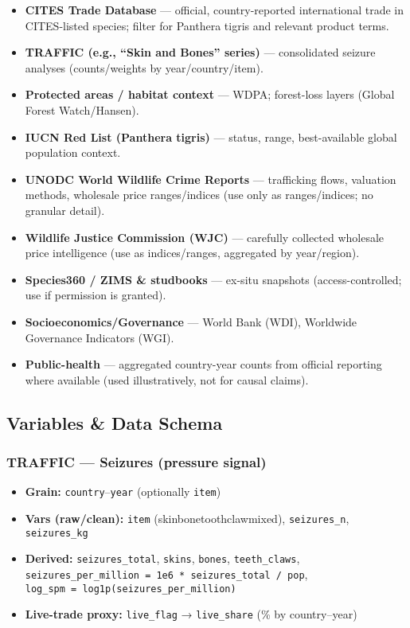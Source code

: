 \documentclass[
]{article}
\providecommand{\tightlist}{%
  \setlength{\itemsep}{0pt}\setlength{\parskip}{0pt}}
\begin{document}
\begin{itemize}
\item
  \textbf{CITES Trade Database} --- official, country-reported
  international trade in CITES-listed species; filter for Panthera
  tigris and relevant product terms.
\item
  \textbf{TRAFFIC (e.g., ``Skin and Bones'' series)} --- consolidated
  seizure analyses (counts/weights by year/country/item).
\item
  \textbf{Protected areas / habitat context} --- WDPA; forest-loss
  layers (Global Forest Watch/Hansen).
\item
  \textbf{IUCN Red List (Panthera tigris)} --- status, range,
  best-available global population context.
\item
  \textbf{UNODC World Wildlife Crime Reports} --- trafficking flows,
  valuation methods, wholesale price ranges/indices (use only as
  ranges/indices; no granular detail).
\item
  \textbf{Wildlife Justice Commission (WJC)} --- carefully collected
  wholesale price intelligence (use as indices/ranges, aggregated by
  year/region).
\item
  \textbf{Species360 / ZIMS \& studbooks} --- ex-situ snapshots
  (access-controlled; use if permission is granted).
\item
  \textbf{Socioeconomics/Governance} --- World Bank (WDI), Worldwide
  Governance Indicators (WGI).
\item
  \textbf{Public-health} --- aggregated country-year counts from
  official reporting where available (used illustratively, not for
  causal claims).
\end{itemize}

\subsection{Variables \& Data Schema}\label{variables-data-schema}

\subsubsection{TRAFFIC --- Seizures (pressure
signal)}\label{traffic-seizures-pressure-signal}

\begin{itemize}
\tightlist
\item
  \textbf{Grain:} \texttt{country}--\texttt{year} (optionally
  \texttt{item})
\item
  \textbf{Vars (raw/clean):} \texttt{item}
  (skin\textbar bone\textbar tooth\textbar claw\textbar mixed),
  \texttt{seizures\_n}, \texttt{seizures\_kg}
\item
  \textbf{Derived:} \texttt{seizures\_total}, \texttt{skins},
  \texttt{bones}, \texttt{teeth\_claws},
  \texttt{seizures\_per\_million\ =\ 1e6\ *\ seizures\_total\ /\ pop},
  \texttt{log\_spm\ =\ log1p(seizures\_per\_million)}
\item
  \textbf{Live-trade proxy:} \texttt{live\_flag} → \texttt{live\_share}
  (\% by country--year)
\end{itemize}
\end{document}
